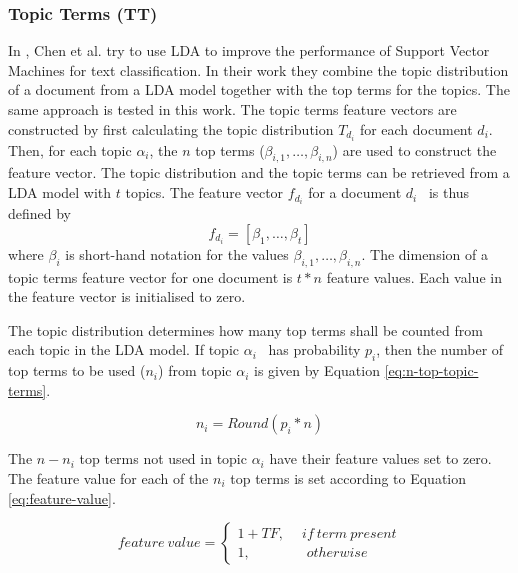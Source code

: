 \subsubsection{Topic Terms (TT)} \label{sec:theory-topic-terms}
In \cite{Chen2016}, Chen et al. try to use LDA to improve the performance of Support Vector Machines for text classification.
In their work they combine the topic distribution of a document from a LDA model together with the top terms for the topics.
The same approach is tested in this work.
The topic terms feature vectors are constructed by first calculating the topic distribution $T_{d_i}$ for each document $d_i$.
Then, for each topic $\alpha_i$, the $n$ top terms ($\beta_{i, 1}, \ldots, \beta_{i, n}$) are used to construct the feature vector.
The topic distribution and the topic terms can be retrieved from a LDA model with $t$ topics.
The feature vector $f_{d_i}$ for a document $d_i$  is thus defined by 
\begin{equation*}
    f_{d_i}=[\beta_1, \ldots, \beta_t]
\end{equation*}
where $\beta_i$ is short-hand notation for the values $\beta_{i, 1}, \ldots, \beta_{i, n}$. 
The dimension of a topic terms feature vector for one document is $t*n$ feature values.
Each value in the feature vector is initialised to zero.

The topic distribution determines how many top terms shall be counted from each topic in the LDA model.
If topic $\alpha_i$  has probability $p_i$, then the number of top terms to be used ($n_i$) from topic $\alpha_i$ is given by Equation \ref{eq:n-top-topic-terms}.

\begin{equation} \label{eq:n-top-topic-terms}
    n_i=Round(p_i*n)
\end{equation}

The $n-n_i$ top terms not used in topic $\alpha_i$ have their feature values set to zero.
The feature value for each of the $n_i$ top terms is set according to Equation \ref{eq:feature-value}.

\begin{equation} \label{eq:feature-value}
    feature\ value =\left\{
                \begin{array}{ll}
                  1+TF, \quad \ if\ term\ present\\
                  1, \qquad\qquad otherwise
                \end{array}
              \right.
\end{equation}

